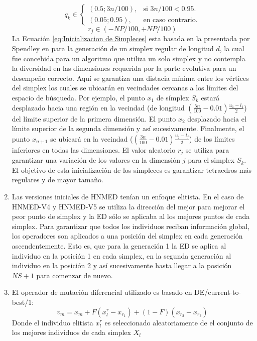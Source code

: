 \begin{enumerate}
	\begin{equation}
	q_k \in \begin{cases}
	(0.5;3n/100), & \text{si $3n/100 <0.95$}.\\
	(0.05;0.95), & \text{en caso contrario}.
	\end{cases}
	\end{equation}
	\begin{equation}
	r_j \in (-NP/100,+NP/100) 
	\end{equation}
	La Ecuación \ref{eq:Inicializacion de Simpleces} esta basada en la presentada por Spendley en \cite{spendley_sequential_1962} para la generación de un simplex regular de longitud $d$, la cual fue concebida para un algoritmo que utiliza un solo simplex y no contempla la diversidad en las dimensiones requerida por la parte evolutiva para un desempeño correcto. Aquí se garantiza una distacia mínima entre los vértices del simplex los cuales se ubicarán en vecindades cercanas a los límites del espacio de búsqueda. Por ejemplo, el punto $x_1$ de símplex $S_k$  estará desplazado hacia una región en la vecindad (de longitud $(\frac{5n}{100}-0.01)\frac{u_1-l_1}{2}$) del límite superior de la primera dimensión. El punto $x_2$ desplazado hacia el límite superior de la segunda dimensión y así sucesivamente. Finalmente, el punto $x_{n+1}$ se ubicará en la vecindad ($(\frac{3n}{100}-0.01)\frac{u_j-l_j}{2}$) de los límites inferiores en todas las dimensiones. El valor aleatorio $r_j$ se utiliza para garantizar una variación de los valores en la dimensión $j$ para el simplex $S_k$. El objetivo de esta inicialización de los símpleces es garantizar tetraedros más regulares y de mayor tamaño. 
	
	\item Las versiones iniciales de HNMED tenían un enfoque elitista. En el caso de HNMED-V4 y HNMED-V5 se utiliza la dirección del mejor para mejorar el peor punto de simplex y la ED sólo se aplicaba al los mejores puntos de cada simplex. Para garantizar que todos los individuos reciban información global, los operadores son aplicados a una posición del simplex en cada generación ascendentemente. Esto es, que para la generación 1 la ED se aplica al individuo en la posición 1 en cada simplex, en la segunda generación al individuo en la posición 2 y así sucesivamente hasta llegar a la posición $NS+1$ para comenzar de nuevo.  
	\item El operador de mutación diferencial utilizado es basado en DE/current-to-best/1:
	\begin{equation}
	v_m= x_m+F(x^r_l-x_{r_1})+(1-F)(x_{r_2}-x_{r_3})
	\end{equation}
	Donde el individuo elitista $x^r_l$ es seleccionado aleatoriamente de el conjunto de los mejores individuos de cada simplex $X_l$ 
\end{enumerate}

